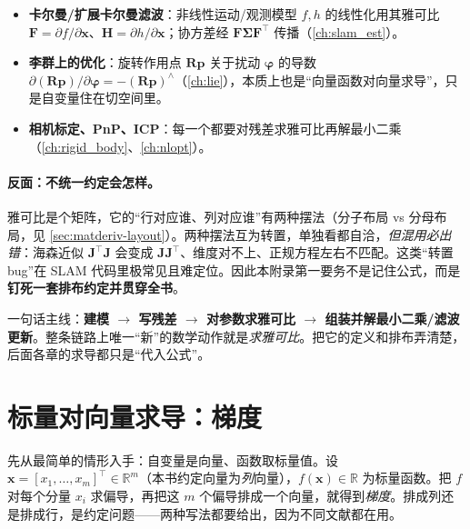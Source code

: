 \begin{itemize}
  \item \textbf{卡尔曼/扩展卡尔曼滤波}：非线性运动/观测模型 $f,h$ 的线性化用其雅可比 $\mathbf{F}=\partial f/\partial\mathbf{x}$、$\mathbf{H}=\partial h/\partial\mathbf{x}$；协方差经 $\mathbf{F}\boldsymbol{\Sigma}\mathbf{F}^\top$ 传播（\cref{ch:slam_est}）。
  \item \textbf{李群上的优化}：旋转作用点 $\mathbf{R}\mathbf{p}$ 关于扰动 $\boldsymbol{\varphi}$ 的导数 $\partial(\mathbf{R}\mathbf{p})/\partial\boldsymbol{\varphi}=-(\mathbf{R}\mathbf{p})^\wedge$（\cref{ch:lie}），本质上也是“向量函数对向量求导”，只是自变量住在切空间里。
  \item \textbf{相机标定、PnP、ICP}：每一个都要对残差求雅可比再解最小二乘（\cref{ch:rigid_body}、\cref{ch:nlopt}）。
\end{itemize}

\paragraph{反面：不统一约定会怎样。}
雅可比是个矩阵，它的“行对应谁、列对应谁”有两种摆法（分子布局 vs 分母布局，见 \cref{sec:matderiv-layout}）。两种摆法互为转置，单独看都自洽，\emph{但混用必出错}：海森近似 $\mathbf{J}^\top\mathbf{J}$ 会变成 $\mathbf{J}\mathbf{J}^\top$、维度对不上、正规方程左右不匹配。这类“转置 bug”在 SLAM 代码里极常见且难定位。因此本附录第一要务不是记住公式，而是\textbf{钉死一套排布约定并贯穿全书}。

\begin{insight}
一句话主线：\textbf{建模 $\to$ 写残差 $\to$ 对参数求雅可比 $\to$ 组装并解最小二乘/滤波更新}。整条链路上唯一“新”的数学动作就是\emph{求雅可比}。把它的定义和排布弄清楚，后面各章的求导都只是“代入公式”。
\end{insight}

\section{标量对向量求导：梯度}
\label{sec:matderiv-scalar}

先从最简单的情形入手：自变量是向量、函数取标量值。设 $\mathbf{x}=[x_1,\dots,x_m]^\top\in\mathbb{R}^m$（本书约定向量为\emph{列}向量），$f(\mathbf{x})\in\mathbb{R}$ 为标量函数。把 $f$ 对每个分量 $x_i$ 求偏导，再把这 $m$ 个偏导排成一个向量，就得到\emph{梯度}。排成列还是排成行，是约定问题——两种写法都要给出，因为不同文献都在用。

